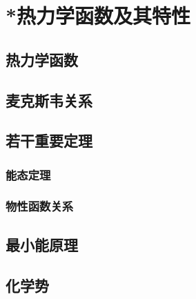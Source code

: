 

\section{*热力学函数及其特性}\label{11-5}

\subsection{热力学函数}\label{11-5-1}

\subsection{麦克斯韦关系}\label{11-5-2}

\subsection{若干重要定理}\label{11-5-3}

\subsubsection{能态定理}\label{11-5-3-1}

\subsubsection{物性函数关系}\label{11-5-3-2}

\subsection{最小能原理}\label{11-5-4}

\subsection{化学势}\label{11-5-5}